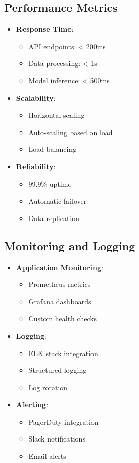 \documentclass[12pt]{article}
\begin{document}
\subsection{Performance Metrics}
\begin{itemize}
    \item \textbf{Response Time}:
    \begin{itemize}
        \item API endpoints: < 200ms
        \item Data processing: < 1s
        \item Model inference: < 500ms
    \end{itemize}
    \item \textbf{Scalability}:
    \begin{itemize}
        \item Horizontal scaling
        \item Auto-scaling based on load
        \item Load balancing
    \end{itemize}
    \item \textbf{Reliability}:
    \begin{itemize}
        \item 99.9\% uptime
        \item Automatic failover
        \item Data replication
    \end{itemize}
\end{itemize}

\subsection{Monitoring and Logging}
\begin{itemize}
    \item \textbf{Application Monitoring}:
    \begin{itemize}
        \item Prometheus metrics
        \item Grafana dashboards
        \item Custom health checks
    \end{itemize}
    \item \textbf{Logging}:
    \begin{itemize}
        \item ELK stack integration
        \item Structured logging
        \item Log rotation
    \end{itemize}
    \item \textbf{Alerting}:
    \begin{itemize}
        \item PagerDuty integration
        \item Slack notifications
        \item Email alerts
    \end{itemize}
\end{itemize}
\end{document}
